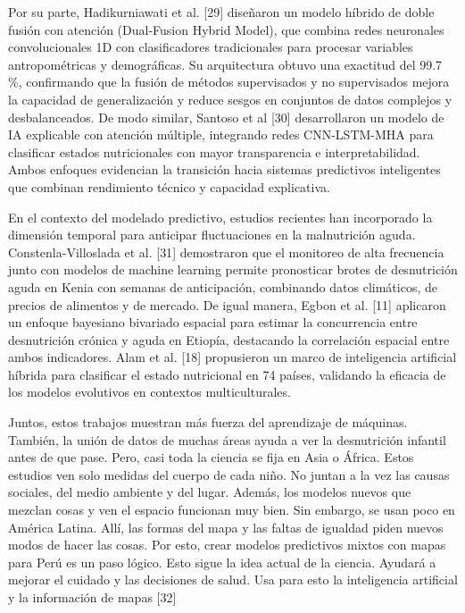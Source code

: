 \documentclass[
]{report}
\begin{document}
Por su parte, Hadikurniawati et al. {[}29{]} diseñaron un modelo híbrido
de doble fusión con atención (Dual-Fusion Hybrid Model), que combina
redes neuronales convolucionales 1D con clasificadores tradicionales
para procesar variables antropométricas y demográficas. Su arquitectura
obtuvo una exactitud del 99.7 \%, confirmando que la fusión de métodos
supervisados y no supervisados mejora la capacidad de generalización y
reduce sesgos en conjuntos de datos complejos y desbalanceados. De modo
similar, Santoso et al {[}30{]} desarrollaron un modelo de IA explicable
con atención múltiple, integrando redes CNN-LSTM-MHA para clasificar
estados nutricionales con mayor transparencia e interpretabilidad. Ambos
enfoques evidencian la transición hacia sistemas predictivos
inteligentes que combinan rendimiento técnico y capacidad explicativa.

En el contexto del modelado predictivo, estudios recientes han
incorporado la dimensión temporal para anticipar fluctuaciones en la
malnutrición aguda. Constenla-Villoslada et al. {[}31{]} demostraron que
el monitoreo de alta frecuencia junto con modelos de machine learning
permite pronosticar brotes de desnutrición aguda en Kenia con semanas de
anticipación, combinando datos climáticos, de precios de alimentos y de
mercado. De igual manera, Egbon et al. {[}11{]} aplicaron un enfoque
bayesiano bivariado espacial para estimar la concurrencia entre
desnutrición crónica y aguda en Etiopía, destacando la correlación
espacial entre ambos indicadores. Alam et al. {[}18{]} propusieron un
marco de inteligencia artificial híbrida para clasificar el estado
nutricional en 74 países, validando la eficacia de los modelos
evolutivos en contextos multiculturales.

Juntos, estos trabajos muestran más fuerza del aprendizaje de máquinas.
También, la unión de datos de muchas áreas ayuda a ver la desnutrición
infantil antes de que pase. Pero, casi toda la ciencia se fija en Asia o
África. Estos estudios ven solo medidas del cuerpo de cada niño. No
juntan a la vez las causas sociales, del medio ambiente y del lugar.
Además, los modelos nuevos que mezclan cosas y ven el espacio funcionan
muy bien. Sin embargo, se usan poco en América Latina. Allí, las formas
del mapa y las faltas de igualdad piden nuevos modos de hacer las cosas.
Por esto, crear modelos predictivos mixtos con mapas para Perú es un
paso lógico. Esto sigue la idea actual de la ciencia. Ayudará a mejorar
el cuidado y las decisiones de salud. Usa para esto la inteligencia
artificial y la información de mapas {[}32{]}
\end{document}
